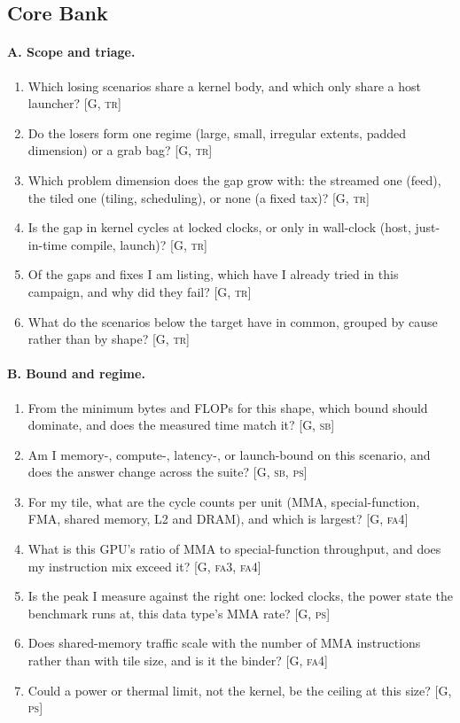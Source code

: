\subsection{Core Bank}

\paragraph{A. Scope and triage.}
\begin{enumerate}[nosep,leftmargin=*]
\item Which losing scenarios share a kernel body, and which only share a host launcher? [G, \textsc{tr}]
\item Do the losers form one regime (large, small, irregular extents, padded dimension) or a grab bag? [G, \textsc{tr}]
\item Which problem dimension does the gap grow with: the streamed one (feed), the tiled one (tiling, scheduling), or none (a fixed tax)? [G, \textsc{tr}]
\item Is the gap in kernel cycles at locked clocks, or only in wall-clock (host, just-in-time compile, launch)? [G, \textsc{tr}]
\item Of the gaps and fixes I am listing, which have I already tried in this campaign, and why did they fail? [G, \textsc{tr}]
\item What do the scenarios below the target have in common, grouped by cause rather than by shape? [G, \textsc{tr}]
\end{enumerate}

\paragraph{B. Bound and regime.}
\begin{enumerate}[nosep,leftmargin=*,resume]
\item From the minimum bytes and FLOPs for this shape, which bound should dominate, and does the measured time match it? [G, \textsc{sb}]
\item Am I memory-, compute-, latency-, or launch-bound on this scenario, and does the answer change across the suite? [G, \textsc{sb}, \textsc{ps}]
\item For my tile, what are the cycle counts per unit (MMA, special-function, FMA, shared memory, L2 and DRAM), and which is largest? [G, \textsc{fa4}]
\item What is this GPU's ratio of MMA to special-function throughput, and does my instruction mix exceed it? [G, \textsc{fa3}, \textsc{fa4}]
\item Is the peak I measure against the right one: locked clocks, the power state the benchmark runs at, this data type's MMA rate? [G, \textsc{ps}]
\item Does shared-memory traffic scale with the number of MMA instructions rather than with tile size, and is it the binder? [G, \textsc{fa4}]
\item Could a power or thermal limit, not the kernel, be the ceiling at this size? [G, \textsc{ps}]
\end{enumerate}

